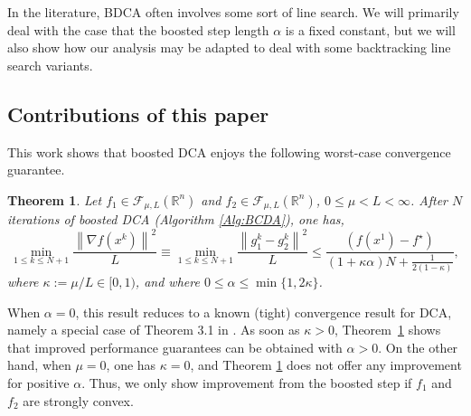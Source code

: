 \documentclass{article} %
\newtheorem{theorem}{Theorem}
\renewcommand{\leq}{\leqslant}
\begin{document}
{
In the literature, BDCA often involves some sort of line search.
We will primarily deal with the case that the boosted step length $\alpha$ is a fixed constant, but we will also show how our analysis may be adapted to deal with some backtracking line search variants}.


\subsection*{Contributions of this paper}
This work shows that boosted DCA enjoys the following worst-case convergence guarantee.

\begin{theorem}
\label{thm:main}
Let $f_1\in\mathcal{F}_{\mu, L}({\mathbb{R}^n})$ and $f_2\in\mathcal{F}_{\mu, L}({\mathbb{R}^n})$, $0 \le \mu < L < \infty$. After $N$ iterations of boosted DCA (Algorithm \ref{Alg:BCDA}), one has,
 \[
 { \min_{1\leq k\leq N+1}\frac{\left\|\nabla f(x^k)\right\|^2}{L} \equiv}
    \min_{1\leq k\leq N+1}\frac{\left\|g_1^k-g_2^k\right\|^2}{L}\leq \frac{(f(x^1)-f^\star) }{(1+\kappa\alpha)N + \frac{1}{2(1-\kappa)}},
\]
where $\kappa := \mu/L \in [0,1)$, and where $0 \le \alpha \le \min \{1,2\kappa\}$.
\end{theorem}
When $\alpha = 0$, this result reduces to a known (tight) convergence result for DCA, namely a special case of Theorem 3.1 in \cite{abbaszad2024DCA}. As soon as $\kappa > 0$, Theorem~\ref{thm:main} shows that improved performance guarantees can be obtained with $\alpha > 0$. { On the other hand, when $\mu = 0$, one has $\kappa = 0$, and Theorem \ref{thm:main} does not offer any improvement for positive $\alpha$. Thus, we only show improvement from the boosted step if $f_1$ and $f_2$ are strongly convex.}
\end{document}
